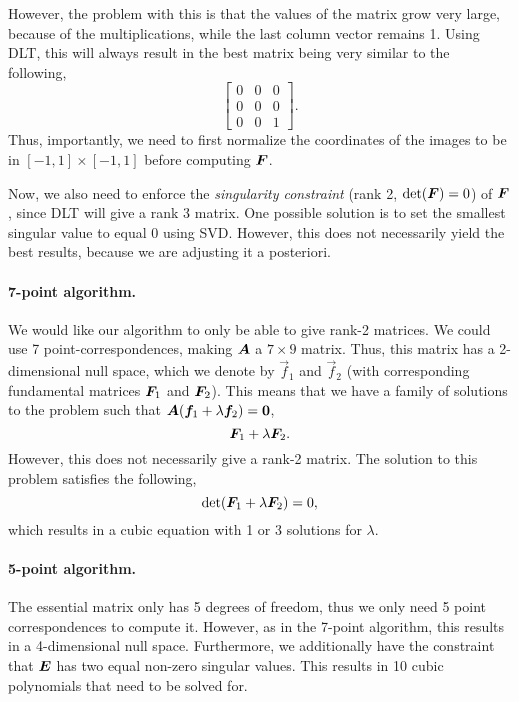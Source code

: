However, the problem with this is that the values of the matrix grow very large,
because of the multiplications, while the last column vector remains 1. Using
DLT, this will always result in the best matrix being very similar to the
following, \[
  \begin{bmatrix}
    0 & 0 & 0 \\
    0 & 0 & 0 \\
    0 & 0 & 1
  \end{bmatrix}
.\]
Thus, importantly, we need to first normalize the coordinates of the images to
be in $[-1, 1]\times[-1, 1]$ before computing $\bm{F}$.

Now, we also need to enforce the \textit{singularity constraint} (rank 2,
$\det{\mat{F}}=0$) of $\bm{F}$, since DLT will give a rank 3 matrix. One
possible solution is to set the smallest singular value to equal 0 using
SVD. However, this does not necessarily yield the best results, because we are
adjusting it a posteriori.

\paragraph{7-point algorithm.}

We would like our algorithm to only be able to give rank-2 matrices. We could
use 7 point-correspondences, making $\bm{A}$ a $7\times 9$ matrix. Thus, this matrix has a 2-dimensional null space, which we
denote by $\vec{f}_1$ and $\vec{f}_2$ (with corresponding fundamental matrices
$\bm{F}_1$ and $\bm{F}_2$). This means that we have a family of solutions to
the problem such that $\bm{A} (\bm{f}_1 + \lambda \bm{f}_2) = \bm{0}$, \[
  \bm{F}_1 + \lambda \bm{F}_2
.\]
However, this does not necessarily give a rank-2 matrix. The solution to this
problem satisfies the following, \[
  \det{\mat{F}_1 + \lambda \mat{F}_2} = 0
,\]
which results in a cubic equation with 1 or 3 solutions for $\lambda$.

\paragraph{5-point algorithm.}

The essential matrix only has 5 degrees of freedom, thus we only need 5 point
correspondences to compute it. However, as in the 7-point algorithm, this
results in a 4-dimensional null space. Furthermore, we additionally have the
constraint that $\bm{E}$ has two equal non-zero singular values. This results
in 10 cubic polynomials that need to be solved for.

